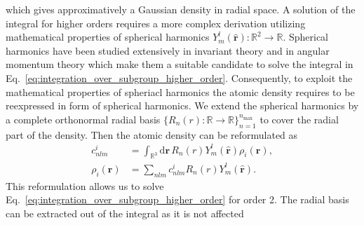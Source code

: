 which gives approximatively a Gaussian density in radial space.
A solution of the integral for higher orders requires a more complex derivation utilizing mathematical properties of spherical harmonics $Y_m^l(\hat{\mathbf{r}}):\mathbb{R}^2\rightarrow\mathbb{R}$. %
Spherical harmonics have been studied extensively in invariant theory\cite{dowker2008spherical} and in angular momentum theory\cite{yutsis1965theory} which make them a suitable candidate to solve the integral in Eq.~\eqref{eq:integration_over_subgroup_higher_order}.
Consequently, to exploit the mathematical properties of spheriacl harmonics the atomic density requires to be reexpressed in form of spherical harmonics.
We extend the spherical harmonics by a complete orthonormal radial basis $\{R_n(r) :\mathbb{R}\rightarrow\mathbb{R}\}_{n=1}^{n_\textrm{max}}$ to cover the radial part of the density.
Then the atomic density can be reformulated as
\begin{subequations}
\begin{align}
  c^i_{nlm} &= \int_{\mathbb{R}^3}\mathrm{d}\mathbf{r}\, R_n(r)Y^l_m(\hat{\mathbf{r}})\rho_i(\mathbf{r}), \\
  \rho_i(\mathbf{r}) &= \sum_{nlm} c^i_{nlm}R_n(r)Y^l_m(\hat{\mathbf{r}}).
  \label{eq:radial_angular_density}
\end{align}
\end{subequations}
This reformulation allows us to solve Eq.~\eqref{eq:integration_over_subgroup_higher_order} for order 2.
The radial basis can be extracted out of the integral as it is not affected 
